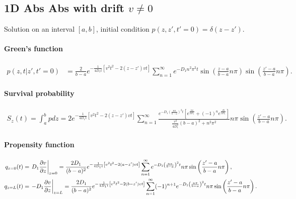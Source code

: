 
\subsection{1D Abs Abs with drift $v\neq 0$}

Solution on an interval $[a,b]$, initial condition $p(z,z',t'=0)=\delta (z-z')$.

\paragraph{Green's function}
\begin{align}
  p(z,t|z',t'=0) &= \frac{2}{b-a}e^{-\frac{1}{4D_1t}\left[v^2t^2 - 2(z-z')vt \right]}
  \sum_{n=1}^{\infty}
  e^{-D_1n^2\pi^2 t} \sin\left(\frac{z-a}{b-a}n\pi\right) \sin\left(\frac{z'-a}{b-a}n\pi\right).
\end{align}

\paragraph{Survival probability}
\begin{align}
  S_z(t) = \int_a^b pdz
  = 2e^{-\frac{1}{4D_1t}\left[ v^2t^2 - 2(z-z')vt \right]}
    \sum_{n=1}^{\infty} \frac{ e^{-D_1\left(\frac{n\pi}{b-a}\right)^2 t} \left[ e^{\frac{va}{2D_1}} + (-1)^ne^{\frac{vb}{2D_1}}\right] }{ \frac{v^2}{4D_1^2}(b-a)^2 + n^2\pi^2 }
    n\pi \sin\left(\frac{z'-a}{b-a}n\pi \right).
\end{align}

\paragraph{Propensity function}
\begin{align}
  q_{z=0}(t) &= \left.D_1 \frac{\partial v}{\partial z}\right|_{z=0} = \frac{2 D_1}{(b-a)^2} e^{-\frac{1}{4D_1 t}\left[ v^2t^2 - 2(a-z')vt \right]}
  \sum_{n=1}^{\infty} e^{-D_1\left(\frac{n\pi}{b-a}\right)^2 t} n\pi \sin\left(\frac{z'-a}{b-a}n\pi\right),\\
  q_{z=L}(t) &= \left.- D_1 \frac{\partial v}{\partial z}\right|_{z=L} = \frac{2 D_1}{(b-a)^2} e^{-\frac{1}{4D_1 t}\left[ v^2t^2 - 2(b-z')vt \right]}
  \sum_{n=1}^{\infty} (-1)^{n+1} e^{-D_1\left(\frac{n\pi}{b-a}\right)^2 t} n\pi \sin\left(\frac{z'-a}{b-a}n\pi\right).
\end{align}

